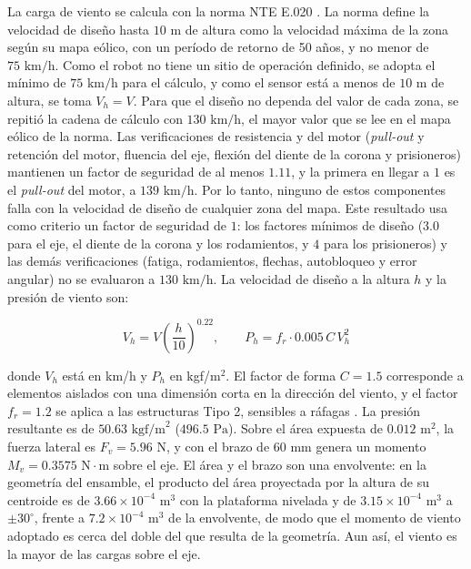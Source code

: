 \documentclass[../../General.tex]{subfiles}
\begin{document}
La carga de viento se calcula con la norma NTE E.020 \citep{nte_e020}. La norma define la velocidad de diseño hasta $10\text{ m}$ de altura como la velocidad máxima de la zona según su mapa eólico, con un período de retorno de 50 años, y no menor de $75\text{ km/h}$. Como el robot no tiene un sitio de operación definido, se adopta el mínimo de $75\text{ km/h}$ para el cálculo, y como el sensor está a menos de $10\text{ m}$ de altura, se toma $V_h = V$. Para que el diseño no dependa del valor de cada zona, se repitió la cadena de cálculo con $130\text{ km/h}$, el mayor valor que se lee en el mapa eólico de la norma. Las verificaciones de resistencia y del motor (\textit{pull-out} y retención del motor, fluencia del eje, flexión del diente de la corona y prisioneros) mantienen un factor de seguridad de al menos $1.11$, y la primera en llegar a $1$ es el \textit{pull-out} del motor, a $139\text{ km/h}$. Por lo tanto, ninguno de estos componentes falla con la velocidad de diseño de cualquier zona del mapa. Este resultado usa como criterio un factor de seguridad de $1$: los factores mínimos de diseño ($3.0$ para el eje, el diente de la corona y los rodamientos, y $4$ para los prisioneros) y las demás verificaciones (fatiga, rodamientos, flechas, autobloqueo y error angular) no se evaluaron a $130\text{ km/h}$. La velocidad de diseño a la altura $h$ y la presión de viento son:

\begin{equation}\label{eq:viento_tilt}
    V_h = V \left(\frac{h}{10}\right)^{0.22}, \qquad P_h = f_r \cdot 0.005\, C\, V_h^2
\end{equation}

donde $V_h$ está en km/h y $P_h$ en kgf/m$^2$. El factor de forma $C = 1.5$ corresponde a elementos aislados con una dimensión corta en la dirección del viento, y el factor $f_r = 1.2$ se aplica a las estructuras Tipo 2, sensibles a ráfagas \citep{nte_e020}. La presión resultante es de $50.63\text{ kgf/m}^2$ ($496.5\text{ Pa}$). Sobre el área expuesta de $0.012\text{ m}^2$, la fuerza lateral es $F_v = 5.96\text{ N}$, y con el brazo de $60\text{ mm}$ genera un momento $M_v = 0.3575\text{ N}\cdot\text{m}$ sobre el eje. El área y el brazo son una envolvente: en la geometría del ensamble, el producto del área proyectada por la altura de su centroide es de $3.66 \times 10^{-4}\text{ m}^3$ con la plataforma nivelada y de $3.15 \times 10^{-4}\text{ m}^3$ a $\pm 30^\circ$, frente a $7.2 \times 10^{-4}\text{ m}^3$ de la envolvente, de modo que el momento de viento adoptado es cerca del doble del que resulta de la geometría. Aun así, el viento es la mayor de las cargas sobre el eje.
\end{document}
